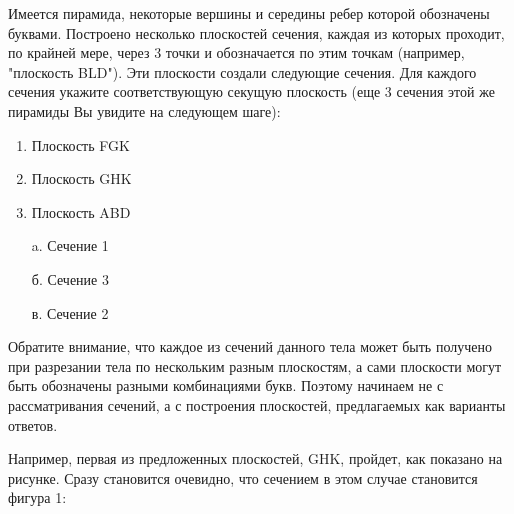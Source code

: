 
Имеется пирамида, некоторые вершины и середины ребер которой обозначены буквами.  Построено несколько плоскостей сечения, каждая из которых проходит, по крайней мере, через 3 точки и обозначается по этим точкам (например, "плоскость BLD").  Эти плоскости создали следующие сечения. Для каждого сечения укажите соответствующую секущую плоскость (еще 3 сечения этой же пирамиды Вы увидите на следующем шаге):


\begin{multicols}{2}
    {
        \begin{enumerate}
            \item Плоскость FGK
            \item Плоскость GHK
            \item Плоскость ABD
        \end{enumerate}
    }
    {
        \begin{enumerate}
            \item[a.] Сечение 1
            \item[б.] Сечение 3
            \item[в.] Сечение 2  
        \end{enumerate}
    }
\end{multicols}

\solutionSection

Обратите внимание, что каждое из сечений данного тела может быть получено при разрезании тела по нескольким разным плоскостям, а сами плоскости могут быть обозначены разными комбинациями букв. Поэтому начинаем не с рассматривания сечений, а с построения плоскостей, предлагаемых как варианты ответов.

Например, первая из предложенных плоскостей, GHK, пройдет, как показано на рисунке. Сразу становится очевидно, что сечением в этом случае становится фигура 1:


